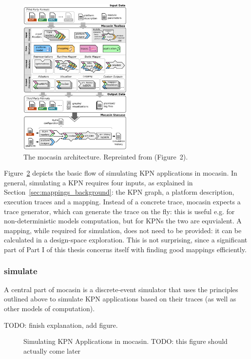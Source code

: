 \begin{figure}[h]
	\centering
   \includegraphics[width=0.5\textwidth]{figures/mocasin.pdf}
	\caption{The mocasin architecture. Repreinted from \cite{menard_rapido21} (Figure~2).}
	\label{fig:mocasin_kpn_simulation}
\end{figure}


Figure~\ref{fig:mocasin_kpn_simulation} depicts the basic flow of simulating KPN applications in mocasin.
In general, simulating a KPN requires four inputs, as explained in Section~\ref{sec:mappings_background}: the KPN graph, a platform description, execution traces and a mapping.
Instead of a concrete trace, mocasin expects a trace generator, which can generate the trace on the fly: this is useful e.g. for non-deterministic models computation, but for KPNs the two are equvialent.
A mapping, while required for simulation, does not need to be provided: it can be calculated in a design-space exploration.
This is not surprising, since a significant part of Part I of this thesis concerns itself with finding good mappings efficiently.

\subsubsection{simulate}
A central part of mocasin is a discrete-event simulator that uses the principles outlined above to simulate KPN applications based on their traces (as well as other models of computation).


TODO: finish explanation, add figure.

\begin{figure}[h]
	\centering
   \resizebox{0.95\textwidth}{!}{}
	\caption{Simulating KPN Applications in mocasin. TODO: this figure should actually come later}
	\label{fig:mocasin_kpn_simulation}
\end{figure}

